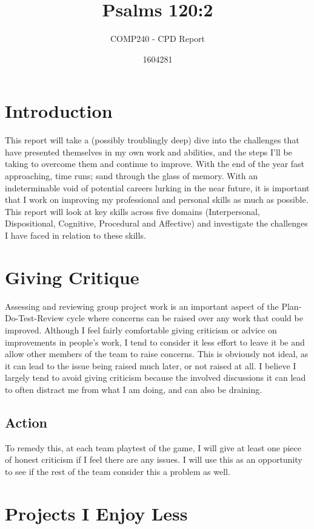 \documentclass{scrartcl}
\title{Psalms 120:2}
\subtitle{COMP240 - CPD Report}
\author{1604281}
\begin{document}
\maketitle

\section{Introduction}

This report will take a (possibly troublingly deep) dive into the challenges that have presented themselves in my own work and abilities, and the steps I’ll be taking to overcome them and continue to improve. With the end of the year fast approaching, time runs; sand through the glass of memory. With an indeterminable void of potential careers lurking in the near future, it is important that I work on improving my professional and personal skills as much as possible. This report will look at key skills across five domains (Interpersonal, Dispositional, Cognitive, Procedural and Affective) and investigate the challenges I have faced in relation to these skills.


\section{Giving Critique}

Assessing and reviewing group project work is an important aspect of the Plan-Do-Test-Review cycle where concerns can be raised over any work that could be improved. Although I feel fairly comfortable giving criticism or advice on improvements in people’s work, I tend to consider it less effort to leave it be and allow other members of the team to raise concerns. This is obviously not ideal, as it can lead to the issue being raised much later, or not raised at all. I believe I largely tend to avoid giving criticism because the involved discussions it can lead to often distract me from what I am doing, and can also be draining.

\subsection{Action}

To remedy this, at each team playtest of the game, I will give at least one piece of honest criticism if I feel there are any issues. I will use this as an opportunity to see if the rest of the team consider this a problem as well.


\section{Projects I Enjoy Less}
\end{document}
